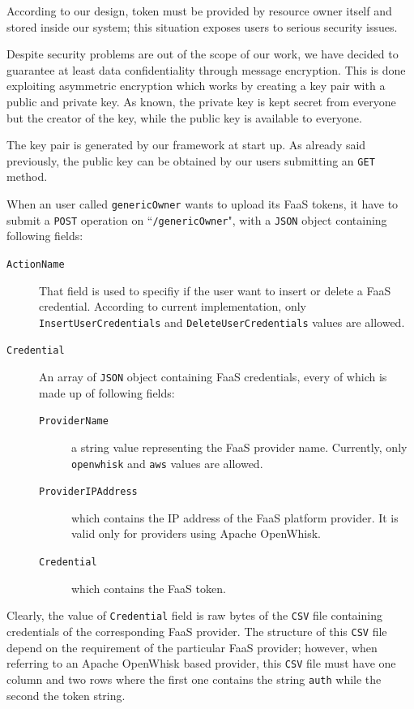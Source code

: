 \documentclass[12pt,a4paper]{report}
\newcommand{\QuoteIntro}{``}
\begin{document}
According to our design, token must be provided by resource owner itself and stored inside our system; this situation exposes users to serious security issues. 

Despite security problems are out of the scope of our work, we have decided to guarantee at least data confidentiality through message encryption. This is done exploiting asymmetric encryption which works by creating a key pair with a public and private key. As known, the private key is kept secret from everyone but the creator of the key, while the public key is available to everyone.

The key pair is generated by our framework at start up. As already said previously, the public key can be obtained by our users submitting an \texttt{GET} method.

When an user called \texttt{genericOwner} wants to upload its FaaS tokens, it have to submit a \texttt{POST} operation on \QuoteIntro\texttt{/genericOwner}", with a \texttt{JSON} object containing following fields:

\begin{description}
	\item[\texttt{ActionName}] That field is used to specifiy if the user want to insert or delete a FaaS credential. According to current implementation, only \texttt{InsertUserCredentials} and \texttt{DeleteUserCredentials} values are allowed.
	
	\item[\texttt{Credential}] An array of \texttt{JSON} object containing FaaS credentials, every of which is made up of following fields:
	
	\begin{description}
		\item[\texttt{ProviderName}] a string value representing the FaaS provider name. Currently, only \texttt{openwhisk} and \texttt{aws} values are allowed.
		
		\item[\texttt{ProviderIPAddress}] which contains the IP address of the FaaS platform provider. It is valid only for providers using Apache OpenWhisk.  
		
		\item[\texttt{Credential}] which contains the FaaS token. 
	\end{description}
\end{description}

Clearly, the value of \texttt{Credential} field is raw bytes of the \texttt{CSV} file containing credentials of the corresponding FaaS provider. The structure of this \texttt{CSV} file depend on the requirement of the particular FaaS provider; however, when referring to an Apache OpenWhisk based provider, this \texttt{CSV} file must have one column and two rows where the first one contains the string \texttt{auth} while the second the token string.
\end{document}
